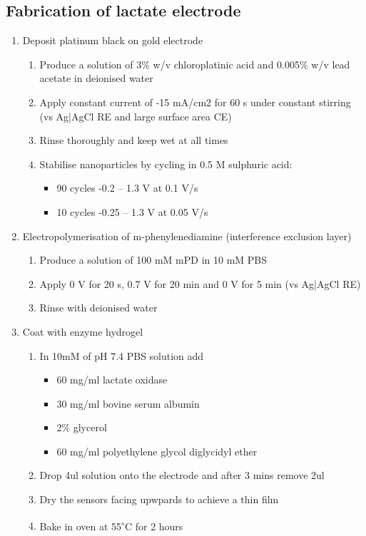 \begin{appendices}
\subsection{Fabrication of lactate electrode}	
\begin{enumerate}
    \item Deposit platinum black on gold electrode
        \begin{enumerate}
            \item Produce a solution of 3$\%$ w/v chloroplatinic acid and 0.005$\%$ w/v lead acetate in deionised water
            \item Apply constant current of -15 mA/cm2 for 60 s under constant stirring (vs Ag|AgCl RE and large surface area CE)
            \item Rinse thoroughly and keep wet at all times
            \item Stabilise nanoparticles by cycling in 0.5 M sulphuric acid:
                \begin{itemize}
                    \item 90 cycles -0.2 – 1.3 V at 0.1 V/s
                    \item 10 cycles -0.25 – 1.3 V at 0.05 V/s
                \end{itemize}
        \end{enumerate}
        
    \item Electropolymerisation of m-phenylenediamine (interference exclusion layer)
        \begin{enumerate}
            \item Produce a solution of 100 mM mPD in 10 mM PBS 
            \item Apply 0 V for 20 s, 0.7 V for 20 min and 0 V for 5 min (vs Ag|AgCl RE)
            \item Rinse with deionised water
        \end{enumerate}
        
    \item Coat with enzyme hydrogel
        \begin{enumerate}
            \item In 10mM of pH 7.4 PBS solution add 
                \begin{itemize}
                    \item 60 mg/ml lactate oxidase
                    \item 30 mg/ml bovine serum albumin
                    \item 2$\%$ glycerol
                    \item 60 mg/ml polyethylene glycol diglycidyl ether
                \end{itemize}
            \item Drop 4ul solution onto the electrode and after 3 mins remove 2ul
            \item Dry the sensors facing upwpards to achieve a thin film
            \item Bake in oven at 55\textsuperscript{$\circ$}C for 2 hours
        \end{enumerate}
        

\end{enumerate}
\end{appendices}
